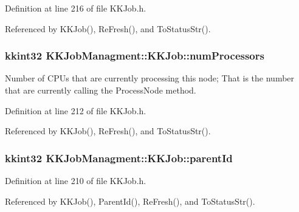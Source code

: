 Definition at line 216 of file K\+K\+Job.\+h.



Referenced by K\+K\+Job(), Re\+Fresh(), and To\+Status\+Str().

\subsubsection[{\texorpdfstring{num\+Processors}{numProcessors}}]{\setlength{\rightskip}{0pt plus 5cm}kkint32 K\+K\+Job\+Managment\+::\+K\+K\+Job\+::num\+Processors\hspace{0.3cm}{\ttfamily [protected]}}\hypertarget{class_k_k_job_managment_1_1_k_k_job_a828964b409f07218424024e972d7d4ef}{}\label{class_k_k_job_managment_1_1_k_k_job_a828964b409f07218424024e972d7d4ef}
Number of C\+PU\textquotesingle{}s that are currently processing this node; That is the number that are currently calling the \textquotesingle{}Process\+Node\textquotesingle{} method. 

Definition at line 212 of file K\+K\+Job.\+h.



Referenced by K\+K\+Job(), Re\+Fresh(), and To\+Status\+Str().

\subsubsection[{\texorpdfstring{parent\+Id}{parentId}}]{\setlength{\rightskip}{0pt plus 5cm}kkint32 K\+K\+Job\+Managment\+::\+K\+K\+Job\+::parent\+Id\hspace{0.3cm}{\ttfamily [protected]}}\hypertarget{class_k_k_job_managment_1_1_k_k_job_a2623203d948d2e6348f7edc572e6abb4}{}\label{class_k_k_job_managment_1_1_k_k_job_a2623203d948d2e6348f7edc572e6abb4}


Definition at line 210 of file K\+K\+Job.\+h.



Referenced by K\+K\+Job(), Parent\+Id(), Re\+Fresh(), and To\+Status\+Str().

